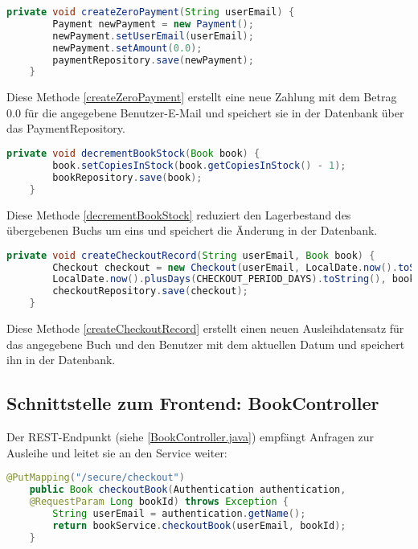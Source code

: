\begin{lstlisting}[language=Java, caption=createZeroPayment(), label=createZeroPayment]
	private void createZeroPayment(String userEmail) {
		Payment newPayment = new Payment();
		newPayment.setUserEmail(userEmail);
		newPayment.setAmount(0.0);
		paymentRepository.save(newPayment);
	}
\end{lstlisting}
Diese Methode \ref{createZeroPayment} erstellt eine neue Zahlung mit dem Betrag 0.0 für die angegebene Benutzer-E-Mail und speichert sie in der Datenbank über das PaymentRepository.

\begin{lstlisting}[language=Java, caption=decrementBookStock(), label=decrementBookStock]
	private void decrementBookStock(Book book) {
		book.setCopiesInStock(book.getCopiesInStock() - 1);
		bookRepository.save(book);
	}
\end{lstlisting}
Diese Methode \ref{decrementBookStock} reduziert den Lagerbestand des übergebenen Buchs um eins und speichert die Änderung in der Datenbank.

\begin{lstlisting}[language=Java, caption=createCheckoutRecord(), label=createCheckoutRecord, breaklines=true]
	private void createCheckoutRecord(String userEmail, Book book) {
		Checkout checkout = new Checkout(userEmail, LocalDate.now().toString(),
		LocalDate.now().plusDays(CHECKOUT_PERIOD_DAYS).toString(), book.getId());
		checkoutRepository.save(checkout);
	}
\end{lstlisting}
Diese Methode \ref{createCheckoutRecord} erstellt einen neuen Ausleihdatensatz für das angegebene Buch und den Benutzer mit dem aktuellen Datum und speichert ihn in der Datenbank.


\subsection*{Schnittstelle zum Frontend: BookController}

Der REST-Endpunkt (siehe \ref{BookController.java}) empfängt Anfragen zur Ausleihe und leitet sie an den Service weiter:

\begin{lstlisting}[language=Java, caption=checkoutBook() im BookController.java, label=BookController.java]
	@PutMapping("/secure/checkout")
	public Book checkoutBook(Authentication authentication,
	@RequestParam Long bookId) throws Exception {
		String userEmail = authentication.getName();
		return bookService.checkoutBook(userEmail, bookId);
	}
\end{lstlisting}

